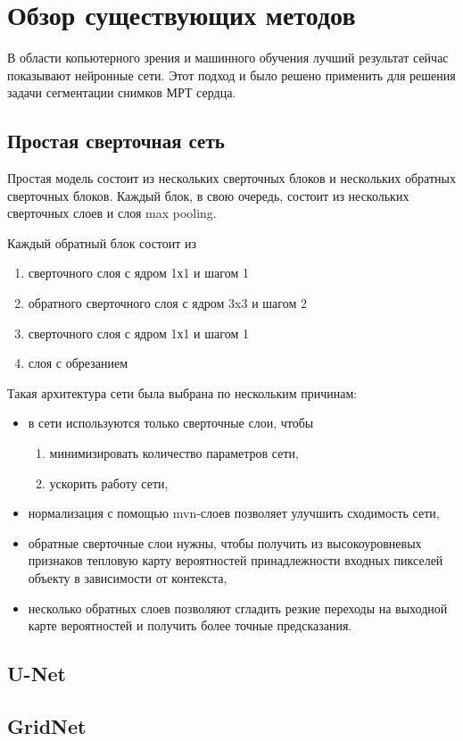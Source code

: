 \section{Обзор существующих методов}

В области копьютерного зрения и машинного обучения лучший результат сейчас показывают нейронные сети. Этот подход и было решено применить для решения задачи сегментации снимков МРТ сердца.

\subsection{Простая сверточная сеть}
 
Простая модель состоит из нескольких сверточных блоков и нескольких обратных сверточных блоков. Каждый блок, в свою очередь, состоит из нескольких сверточных слоев и слоя max pooling. 

Каждый обратный блок состоит из 

\begin{enumerate}
	\item сверточного слоя с ядром 1х1 и шагом 1
	\item обратного сверточного слоя с ядром 3x3 и шагом 2
	\item сверточного слоя с ядром 1х1 и шагом 1
	\item слоя с обрезанием
\end{enumerate}

Такая архитектура сети была выбрана по нескольким причинам:

\begin{itemize}
	\item в сети используются только сверточные слои, чтобы
	\begin{enumerate}
		\item минимизировать количество параметров сети,
		\item ускорить работу сети,
	\end{enumerate}
	\item нормализация с помощью mvn-слоев позволяет улучшить сходимость сети,
	\item обратные сверточные слои нужны, чтобы получить из высокоуровневых признаков тепловую карту вероятностей принадлежности входных пикселей объекту в зависимости от контекста,
	\item несколько обратных слоев позволяют сгладить резкие переходы на выходной карте вероятностей и получить более точные предсказания.
 \end{itemize}

\subsection{U-Net}

\subsection{GridNet}

